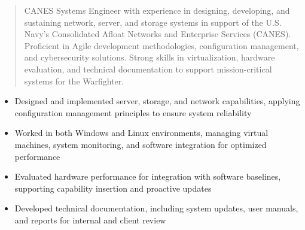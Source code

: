 



\makecvheader

\begin{quote}
  \noindent
  CANES Systems Engineer with experience in designing, developing, and sustaining network, server, and storage systems in support of the U.S. Navy's Consolidated Afloat Networks and Enterprise Services (CANES). Proficient in Agile development methodologies, configuration management, and cybersecurity solutions. Strong skills in virtualization, hardware evaluation, and technical documentation to support mission-critical systems for the Warfighter.
\end{quote}

\par\smallskip
\noindent
\begin{minipage}{20cm}
  \begin{minipage}{9.75cm}
    \begin{itemize}
      \item Designed and implemented server, storage, and network capabilities, applying configuration management principles to ensure system reliability
      \item Worked in both Windows and Linux environments, managing virtual machines, system monitoring, and software integration for optimized performance
    \end{itemize}
  \end{minipage}
  \hfill
  \begin{minipage}{9.75cm}
    \begin{itemize}
      \item Evaluated hardware performance for integration with software baselines, supporting capability insertion and proactive updates
      \item Developed technical documentation, including system updates, user manuals, and reports for internal and client review
    \end{itemize}
  \end{minipage}
\end{minipage}
\par\smallskip
\divider

